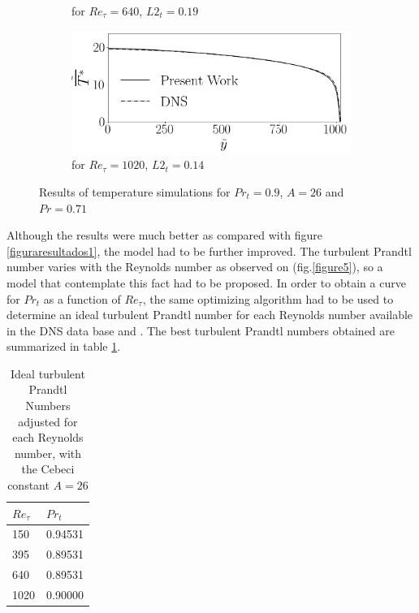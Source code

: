 \documentclass[10pt]{article} %
\begin{document}
\begin{figure}[!h]
\begin{subfigure}[t]{0.5\textwidth}
		\caption{for $Re_\tau = 640$, $L2_t = 0.19$}
	\end{subfigure}
	\begin{subfigure}[t]{0.45\textwidth}
		\centering
		\includegraphics[angle=0, scale=0.24]{fotos_formatacao_final/Temperature_1000_071_Prt0905_A26}
		\caption{for $Re_\tau = 1020$, $L2_t = 0.14$}
	\end{subfigure}	
	\caption{Results of temperature simulations for $Pr_t = 0.9 $, $A = 26$ and $Pr =0.71$ }
	\label{primeiros}
\end{figure}

Although the results were much better as compared with figure \ref{figuraresultados1}, the model had to be further improved. The turbulent Prandtl number varies with the Reynolds number as observed on (fig.\ref{figure5}), so a model that contemplate this fact had to be proposed. 
In order to obtain a curve for $Pr_t$ as a function of $Re_\tau$, the same optimizing algorithm had to be used to determine an ideal turbulent Prandtl number for each Reynolds number available in the DNS data base \cite{DNS1020} and \cite{DNS150}.
The best turbulent Prandtl numbers obtained are summarized in table \ref{tabela1}.

\begin{table}[!h]
	\centering
	\caption{Ideal turbulent Prandtl Numbers adjusted for each Reynolds number, with the Cebeci constant $A = 26$}
	\begin{tabular}{ll}
		  \hline
		  $Re_\tau$ & $Pr_t$\\
		  \hline
		  150  &   0.94531\\
		  395  &   0.89531\\
		  640  &   0.89531\\
		  1020 &   0.90000\\ 
		  \hline
	\end{tabular}
	\label{tabela1}
\end{table}
\end{document}
